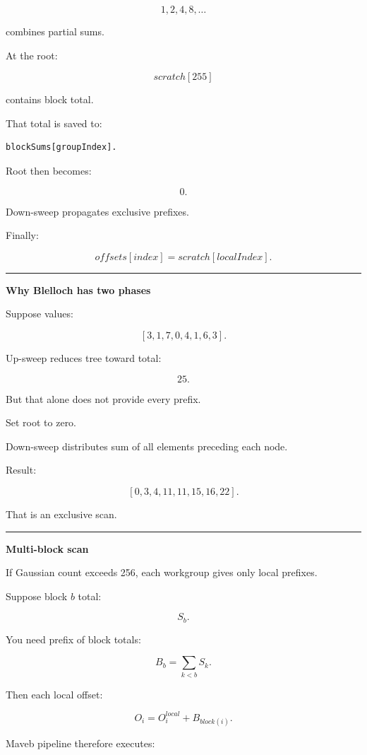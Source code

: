 \[
1,2,4,8,\ldots
\]

combines partial sums.

At the root:

\[
scratch[255]
\]

contains block total.

That total is saved to:

\begin{verbatim}
blockSums[groupIndex].
\end{verbatim}

Root then becomes:

\[
0.
\]

Down-sweep propagates exclusive prefixes.

Finally:

\[
offsets[index]
=
scratch[localIndex].
\]

\begin{center}\rule{0.5\linewidth}{0.5pt}\end{center}

\textbf{Why Blelloch has two phases}

Suppose values:

\[
[3,1,7,0,4,1,6,3].
\]

Up-sweep reduces tree toward total:

\[
25.
\]

But that alone does not provide every prefix.

Set root to zero.

Down-sweep distributes sum of all elements preceding each node.

Result:

\[
\boxed{
[0,3,4,11,11,15,16,22].
}
\]

That is an exclusive scan.

\begin{center}\rule{0.5\linewidth}{0.5pt}\end{center}

\textbf{Multi-block scan}

If Gaussian count exceeds 256, each workgroup gives only local prefixes.

Suppose block \(b\) total:

\[
S_b.
\]

You need prefix of block totals:

\[
B_b
=
\sum_{k<b}S_k.
\]

Then each local offset:

\[
\boxed{
O_i=
O_i^{local}
+
B_{block(i)}.
}
\]

Maveb pipeline therefore executes:

